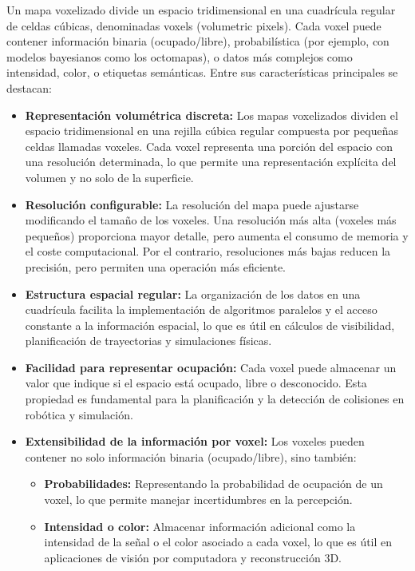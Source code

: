 \documentclass[12pt, a4paper, twoside]{article}
\begin{document}
Un mapa voxelizado divide un espacio tridimensional en una cuadrícula regular de celdas cúbicas, denominadas voxels 
(volumetric pixels). Cada voxel puede contener información binaria (ocupado/libre), probabilística (por ejemplo, con modelos 
bayesianos como los octomapas), o datos más complejos como intensidad, color, o etiquetas semánticas. Entre sus características 
principales se destacan:

\begin{itemize}
  \item \textbf{Representación volumétrica discreta:} Los mapas voxelizados dividen el espacio tridimensional en una rejilla cúbica 
  regular compuesta por pequeñas celdas llamadas voxeles. Cada voxel representa una porción del espacio con una resolución 
  determinada, lo que permite una representación explícita del volumen y no solo de la superficie.
  \item \textbf{Resolución configurable:} La resolución del mapa puede ajustarse modificando el tamaño de los voxeles. Una 
  resolución más alta (voxeles más pequeños) proporciona mayor detalle, pero aumenta el consumo de memoria y el coste 
  computacional. Por el contrario, resoluciones más bajas reducen la precisión, pero permiten una operación más eficiente.
  \item \textbf{Estructura espacial regular:} La organización de los datos en una cuadrícula facilita la implementación de 
  algoritmos paralelos y el acceso constante a la información espacial, lo que es útil en cálculos de visibilidad, planificación 
  de trayectorias y simulaciones físicas.
  \item \textbf{Facilidad para representar ocupación:} Cada voxel puede almacenar un valor que indique si el espacio está ocupado, 
  libre o desconocido. Esta propiedad es fundamental para la planificación y la detección de colisiones en robótica y simulación.
  \item \textbf{Extensibilidad de la información por voxel:} Los voxeles pueden contener no solo información binaria (ocupado/libre), 
  sino también:
  \begin{itemize}
    \item \textbf{Probabilidades:} Representando la probabilidad de ocupación de un voxel, lo que permite manejar incertidumbres 
    en la percepción.
    \item \textbf{Intensidad o color:} Almacenar información adicional como la intensidad de la señal o el color asociado a cada voxel, 
    lo que es útil en aplicaciones de visión por computadora y reconstrucción 3D.

\end{itemize}
\end{itemize}
\end{document}

